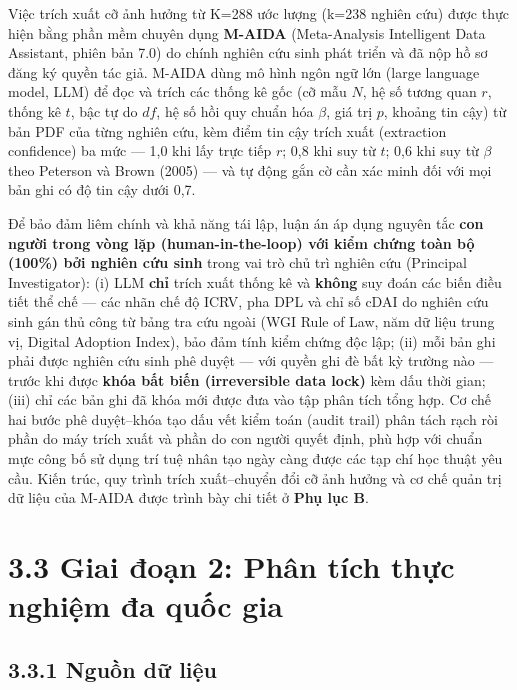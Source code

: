 \documentclass[
  a4paper,
  13pt]{extreport}
\begin{document}
Việc trích xuất cỡ ảnh hưởng từ K=288 ước lượng (k=238 nghiên cứu) được
thực hiện bằng phần mềm chuyên dụng \textbf{M-AIDA} (Meta-Analysis
Intelligent Data Assistant, phiên bản 7.0) do chính nghiên cứu sinh phát
triển và đã nộp hồ sơ đăng ký quyền tác giả. M-AIDA dùng mô hình ngôn
ngữ lớn (large language model, LLM) để đọc và trích các thống kê gốc (cỡ
mẫu \(N\), hệ số tương quan \(r\), thống kê \(t\), bậc tự do \(df\), hệ
số hồi quy chuẩn hóa \(\beta\), giá trị \(p\), khoảng tin cậy) từ bản
PDF của từng nghiên cứu, kèm điểm tin cậy trích xuất (extraction
confidence) ba mức --- 1,0 khi lấy trực tiếp \(r\); 0,8 khi suy từ
\(t\); 0,6 khi suy từ \(\beta\) theo Peterson và Brown (2005) --- và tự
động gắn cờ cần xác minh đối với mọi bản ghi có độ tin cậy dưới 0,7.

Để bảo đảm liêm chính và khả năng tái lập, luận án áp dụng nguyên tắc
\textbf{con người trong vòng lặp (human-in-the-loop) với kiểm chứng toàn
bộ (100\%) bởi nghiên cứu sinh} trong vai trò chủ trì nghiên cứu
(Principal Investigator): (i) LLM \textbf{chỉ} trích xuất thống kê và
\textbf{không} suy đoán các biến điều tiết thể chế --- các nhãn chế độ
ICRV, pha DPL và chỉ số cDAI do nghiên cứu sinh gán thủ công từ bảng tra
cứu ngoài (WGI Rule of Law, năm dữ liệu trung vị, Digital Adoption
Index), bảo đảm tính kiểm chứng độc lập; (ii) mỗi bản ghi phải được
nghiên cứu sinh phê duyệt --- với quyền ghi đè bất kỳ trường nào ---
trước khi được \textbf{khóa bất biến (irreversible data lock)} kèm dấu
thời gian; (iii) chỉ các bản ghi đã khóa mới được đưa vào tập phân tích
tổng hợp. Cơ chế hai bước phê duyệt--khóa tạo dấu vết kiểm toán (audit
trail) phân tách rạch ròi phần do máy trích xuất và phần do con người
quyết định, phù hợp với chuẩn mực công bố sử dụng trí tuệ nhân tạo ngày
càng được các tạp chí học thuật yêu cầu. Kiến trúc, quy trình trích
xuất--chuyển đổi cỡ ảnh hưởng và cơ chế quản trị dữ liệu của M-AIDA được
trình bày chi tiết ở \textbf{Phụ lục B}.

\hypertarget{giai-ux111oux1ea1n-2-phuxe2n-tuxedch-thux1ef1c-nghiux1ec7m-ux111a-quux1ed1c-gia}{%
\section{3.3 Giai đoạn 2: Phân tích thực nghiệm đa quốc
gia}\label{giai-ux111oux1ea1n-2-phuxe2n-tuxedch-thux1ef1c-nghiux1ec7m-ux111a-quux1ed1c-gia}}

\hypertarget{nguux1ed3n-dux1eef-liux1ec7u}{%
\subsection{3.3.1 Nguồn dữ liệu}\label{nguux1ed3n-dux1eef-liux1ec7u}}
\end{document}

